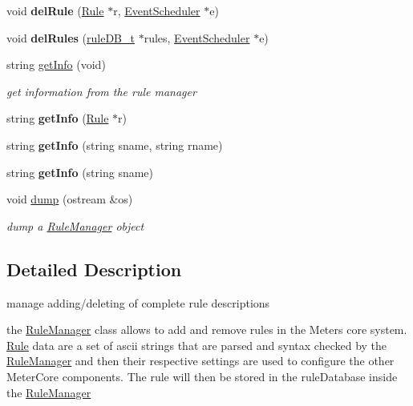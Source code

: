 \begin{DoxyCompactItemize}
void {\bfseries del\+Rule} (\hyperlink{classRule}{Rule} $\ast$r, \hyperlink{classEventScheduler}{Event\+Scheduler} $\ast$e)
\item 
\mbox{\label{classRuleManager_ac6780adf74bf7918005086a594aa1df0}} 
void {\bfseries del\+Rules} (\hyperlink{RuleFileParser_8h_a7d5bb94bb17a8a1d92db2a89a0cc96d1}{rule\+D\+B\+\_\+t} $\ast$rules, \hyperlink{classEventScheduler}{Event\+Scheduler} $\ast$e)
\item 
string \hyperlink{classRuleManager_a15995aaed6daab992a46aeeac5d54e06}{get\+Info} (void)
\begin{DoxyCompactList}\small\item\em get information from the rule manager \end{DoxyCompactList}\item 
\mbox{\label{classRuleManager_a4202560315a439c6359587b08fe4df97}} 
string {\bfseries get\+Info} (\hyperlink{classRule}{Rule} $\ast$r)
\item 
\mbox{\label{classRuleManager_aceef53a03385cd8ea5ee84c679f8cb82}} 
string {\bfseries get\+Info} (string sname, string rname)
\item 
\mbox{\label{classRuleManager_aa7b8b1de53715c8a63d88812f858c9ee}} 
string {\bfseries get\+Info} (string sname)
\item 
\mbox{\label{classRuleManager_a09bd92aa70fdd885ee877d1e2a108d11}} 
void \hyperlink{classRuleManager_a09bd92aa70fdd885ee877d1e2a108d11}{dump} (ostream \&os)
\begin{DoxyCompactList}\small\item\em dump a \hyperlink{classRuleManager}{Rule\+Manager} object \end{DoxyCompactList}\end{DoxyCompactItemize}


\subsection{Detailed Description}
manage adding/deleting of complete rule descriptions 

the \hyperlink{classRuleManager}{Rule\+Manager} class allows to add and remove rules in the Meters core system. \hyperlink{classRule}{Rule} data are a set of ascii strings that are parsed and syntax checked by the \hyperlink{classRuleManager}{Rule\+Manager} and then their respective settings are used to configure the other Meter\+Core components. The rule will then be stored in the rule\+Database inside the \hyperlink{classRuleManager}{Rule\+Manager} 

